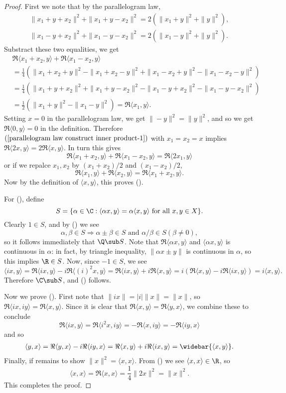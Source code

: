 \begin{proof}
First we note that by the parallelogram law,
\begin{align*}
\|x_1+y+x_2\|^2+\|x_1+y-x_2\|^2=2(\|x_1+y\|^2+\|y\|^2),\\
\|x_1-y+x_2\|^2+\|x_1-y-x_2\|^2=2(\|x_1-y\|^2+\|y\|^2).
\end{align*}
Substract these two equalities, we get
\begin{equation}\label{parallelogram law construct inner product-1}
\begin{aligned}
&\Re\langle x_1+x_2,y\rangle+\Re\langle x_1-x_2,y\rangle\\
&=\frac{1}{4}(\|x_1+x_2+y\|^2-\|x_1+x_2-y\|^2+\|x_1-x_2+y\|^2-\|x_1-x_2-y\|^2)\\
&=\frac{1}{4}(\|x_1+y+x_2\|^2+\|x_1+y-x_2\|^2-\|x_1-y+x_2\|^2-\|x_1-y-x_2\|^2)\\
&=\frac{1}{2}(\|x_1+y\|^2-\|x_1-y\|^2)=\Re\langle x_1,y\rangle.
\end{aligned}
\end{equation}
Setting $x=0$ in the parallelogram law, we get $\|-y\|^2=\|y\|^2$, and so we get $\Re\langle 0,y\rangle=0$ in the definition. Therefore $(\ref{parallelogram law construct inner product-1})$ with $x_1=x_2=x$ implies $\Re\langle 2x,y\rangle=2\Re\langle x,y\rangle$. In turn this gives
\[\Re\langle x_1+x_2,y\rangle+\Re\langle x_1-x_2,y\rangle=\Re\langle 2x_1,y\rangle\]
or if we repalce $x_1,x_2$ by $(x_1+x_2)/2$ and $(x_1-x_2)/2$,
\[\Re\langle x_1,y\rangle+\Re\langle x_2,y\rangle=\Re\langle x_1+x_2,y\rangle.\]
Now by the definition of $\langle x,y\rangle$, this proves ().\par
For (), define
\[S=\{\alpha\in\C:\langle\alpha x,y\rangle=\alpha\langle x,y\rangle\text{ for all $x,y\in X$}\}.\]
Clearly $1\in S$, and by () we see
\[\alpha,\beta\in S\Longrightarrow\alpha\pm\beta\in S\text{ and }\alpha/\beta\in S (\beta\neq 0),\]
so it follows immediately that $\Q\sub S$. Note that $\Re\langle\alpha x,y\rangle$ and $\langle\alpha x,y\rangle$ is continuous in $\alpha$: in fact, by triangle inequality, $\|\alpha x\pm y\|$ is continuous in $\alpha$, so this implies $\R\in S$. Now, since $-1\in S$, we see
\[\langle ix,y\rangle=\Re\langle ix,y\rangle-i\Re\langle(i)^2 x,y\rangle=\Re\langle ix,y\rangle+i\Re\langle x,y\rangle=i(\Re\langle x,y\rangle-i\Re\langle ix,y\rangle)=i\langle x,y\rangle.\]
Therefore $\C\sub S$, and () follows.\par
Now we prove (). First note that $\|ix\|=|i|\|x\|=\|x\|$, so $\Re\langle ix,iy\rangle=\Re\langle x,y\rangle$. Since it is clear that $\Re\langle x,y\rangle=\Re\langle y,x\rangle$, we combine these to conclude
\[\Re\langle ix,y\rangle=\Re\langle i^2x,iy\rangle=-\Re\langle x,iy\rangle=-\Re\langle iy,x\rangle\]
and so
\begin{align*}
\langle y,x\rangle=\Re\langle y,x\rangle-i\Re\langle iy,x\rangle=\Re\langle x,y\rangle+i\Re\langle ix,y\rangle=\widebar{\langle x,y\rangle}.
\end{align*}
Finally, if remains to show $\|x\|^2=\langle x,x\rangle$. From () we see $\langle x,x\rangle\in\R$, so
\[\langle x,x\rangle=\Re\langle x,x\rangle=\frac{1}{4}\|2x\|^2=\|x\|^2.\]
This completes the proof.
\end{proof}
